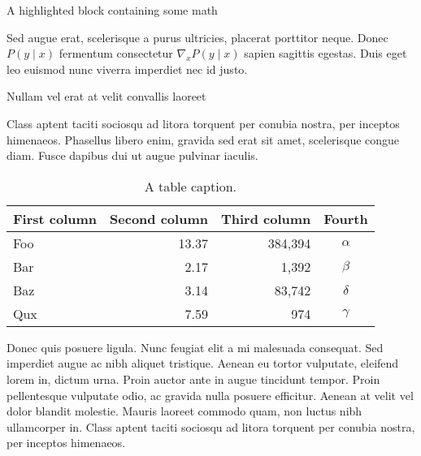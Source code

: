 \documentclass[final]{beamer}
\newlength{\colwidth}
\begin{document}
\begin{frame}[t]
\begin{columns}[t]
\begin{column}{\colwidth}
\begin{exampleblock}{A highlighted block containing some math}

        Sed augue erat, scelerisque a purus ultricies, placerat porttitor neque.
        Donec $P(y \mid x)$ fermentum consectetur $\nabla_x P(y \mid x)$ sapien
        sagittis egestas. Duis eget leo euismod nunc viverra imperdiet nec id
        justo.

      \end{exampleblock}

      \begin{block}{Nullam vel erat at velit convallis laoreet}

        Class aptent taciti sociosqu ad litora torquent per conubia nostra, per
        inceptos himenaeos. Phasellus libero enim, gravida sed erat sit amet,
        scelerisque congue diam. Fusce dapibus dui ut augue pulvinar iaculis.

        \begin{table}
          \centering
          \begin{tabular}{l r r c}
            \toprule
            \textbf{First column} & \textbf{Second column} & \textbf{Third column} & \textbf{Fourth} \\
            \midrule
            Foo                   & 13.37                  & 384,394               & $\alpha$        \\
            Bar                   & 2.17                   & 1,392                 & $\beta$         \\
            Baz                   & 3.14                   & 83,742                & $\delta$        \\
            Qux                   & 7.59                   & 974                   & $\gamma$        \\
            \bottomrule
          \end{tabular}
          \caption{A table caption.}
        \end{table}

        Donec quis posuere ligula. Nunc feugiat elit a mi malesuada consequat. Sed
        imperdiet augue ac nibh aliquet tristique. Aenean eu tortor vulputate,
        eleifend lorem in, dictum urna. Proin auctor ante in augue tincidunt
        tempor. Proin pellentesque vulputate odio, ac gravida nulla posuere
        efficitur. Aenean at velit vel dolor blandit molestie. Mauris laoreet
        commodo quam, non luctus nibh ullamcorper in. Class aptent taciti sociosqu
        ad litora torquent per conubia nostra, per inceptos himenaeos.


\end{block}
\end{column}
\end{columns}
\end{frame}
\end{document}

